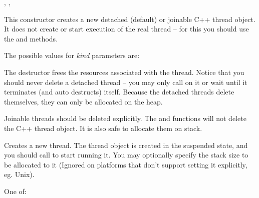 , , 



\label{wxthreadctor}


This constructor creates a new detached (default) or joinable C++ thread object. It
does not create or start execution of the real thread -- for this you should
use the  and  methods.

The possible values for {\it kind} parameters are:

\twocolwidtha{7cm}
\begin{twocollist}\itemsep=0pt
\end{twocollist}




The destructor frees the resources associated with the thread. Notice that you
should never delete a detached thread -- you may only call
 on it or wait until it terminates (and auto
destructs) itself. Because the detached threads delete themselves, they can
only be allocated on the heap.

Joinable threads should be deleted explicitly. The  and  functions
will not delete the C++ thread object. It is also safe to allocate them on
stack.


\label{wxthreadcreate}


Creates a new thread. The thread object is created in the suspended state, and you
should call  to start running it.  You may optionally
specify the stack size to be allocated to it (Ignored on platforms that don't
support setting it explicitly, eg. Unix).


One of:

\twocolwidtha{7cm}
\begin{twocollist}\itemsep=0pt
\end{twocollist}


